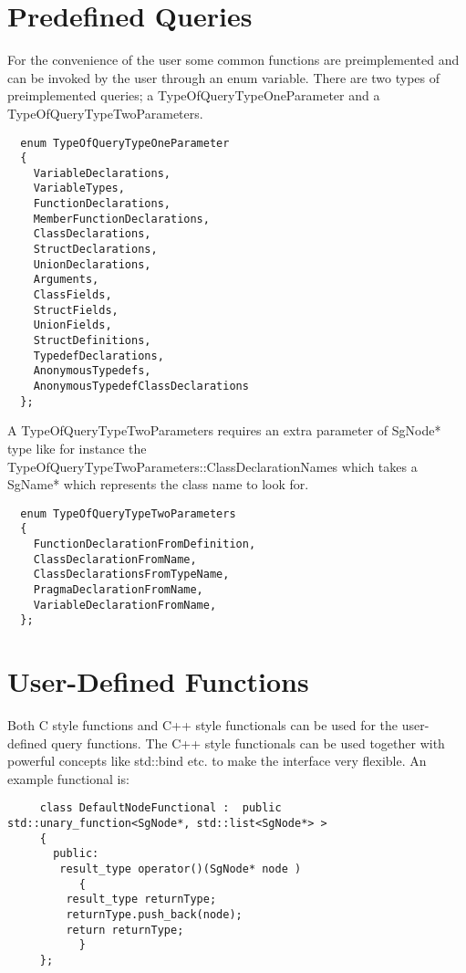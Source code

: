 \section{Predefined Queries}

For the convenience of the user some common functions are preimplemented and
can be invoked by the user through an enum variable. There are two types of
preimplemented queries; a TypeOfQueryTypeOneParameter and a
TypeOfQueryTypeTwoParameters. 

{\mySmallestFontSize
\begin{verbatim}
  enum TypeOfQueryTypeOneParameter
  {
    VariableDeclarations,
    VariableTypes,
    FunctionDeclarations,
    MemberFunctionDeclarations,
    ClassDeclarations,
    StructDeclarations,
    UnionDeclarations,
    Arguments,
    ClassFields,
    StructFields,
    UnionFields,
    StructDefinitions,
    TypedefDeclarations,
    AnonymousTypedefs,
    AnonymousTypedefClassDeclarations
  };
\end{verbatim}
}

A TypeOfQueryTypeTwoParameters requires an
extra parameter of SgNode* type like for instance the
TypeOfQueryTypeTwoParameters::ClassDeclarationNames which takes a SgName*
which represents the class name to look for.

{\mySmallestFontSize
\begin{verbatim}
  enum TypeOfQueryTypeTwoParameters
  {
    FunctionDeclarationFromDefinition,
    ClassDeclarationFromName,
    ClassDeclarationsFromTypeName,
    PragmaDeclarationFromName,
    VariableDeclarationFromName,
  };
\end{verbatim}
}





\section{User-Defined Functions}

Both C style functions and C++ style functionals can be used for the
user-defined query functions. The C++ style functionals can be used together
with powerful concepts like std::bind etc. to make the interface very 
flexible. An example functional is:

{\mySmallestFontSize
\begin{verbatim}
     class DefaultNodeFunctional :  public std::unary_function<SgNode*, std::list<SgNode*> > 
     {
       public:
	    result_type operator()(SgNode* node ) 
	       { 
		 result_type returnType;
		 returnType.push_back(node);
		 return returnType; 
	       }
     };
\end{verbatim}
}


